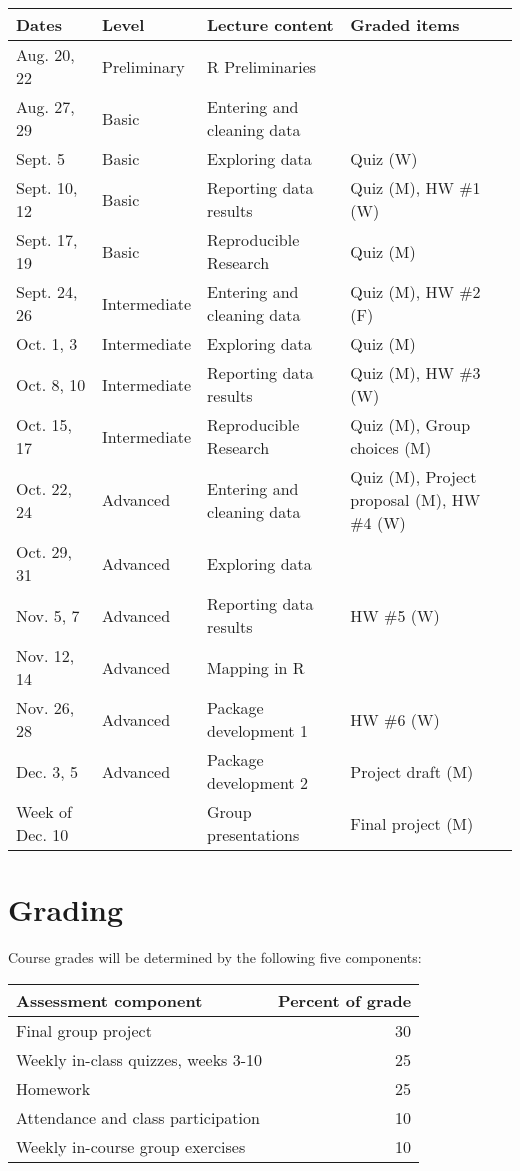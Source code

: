 \documentclass[]{book}
\begin{document}
\begin{tabular}{l|l|l|l}
\hline
Dates & Level & Lecture content & Graded items\\
\hline
Aug. 20, 22 & Preliminary & R Preliminaries & \\
\hline
Aug. 27, 29 & Basic & Entering and cleaning data & \\
\hline
Sept. 5 & Basic & Exploring data & Quiz (W)\\
\hline
Sept. 10, 12 & Basic & Reporting data results & Quiz (M), HW \#1 (W)\\
\hline
Sept. 17, 19 & Basic & Reproducible Research & Quiz (M)\\
\hline
Sept. 24, 26 & Intermediate & Entering and cleaning data & Quiz (M), HW \#2 (F)\\
\hline
Oct. 1, 3 & Intermediate & Exploring data & Quiz (M)\\
\hline
Oct. 8, 10 & Intermediate & Reporting data results & Quiz (M), HW \#3 (W)\\
\hline
Oct. 15, 17 & Intermediate & Reproducible Research & Quiz (M), Group choices (M)\\
\hline
Oct. 22, 24 & Advanced & Entering and cleaning data & Quiz (M), Project proposal (M), HW \#4 (W)\\
\hline
Oct. 29, 31 & Advanced & Exploring data & \\
\hline
Nov. 5, 7 & Advanced & Reporting data results & HW \#5 (W)\\
\hline
Nov. 12, 14 & Advanced & Mapping in R & \\
\hline
Nov. 26, 28 & Advanced & Package development 1 & HW \#6 (W)\\
\hline
Dec. 3, 5 & Advanced & Package development 2 & Project draft (M)\\
\hline
Week of Dec. 10 &  & Group presentations & Final project (M)\\
\hline
\end{tabular}

\hypertarget{grading}{%
\section{Grading}\label{grading}}

Course grades will be determined by the following five components:

\begin{tabular}{l|r}
\hline
Assessment component & Percent of grade\\
\hline
Final group project & 30\\
\hline
Weekly in-class quizzes, weeks 3-10 & 25\\
\hline
Homework & 25\\
\hline
Attendance and class participation & 10\\
\hline
Weekly in-course group exercises & 10\\
\hline
\end{tabular}
\end{document}
